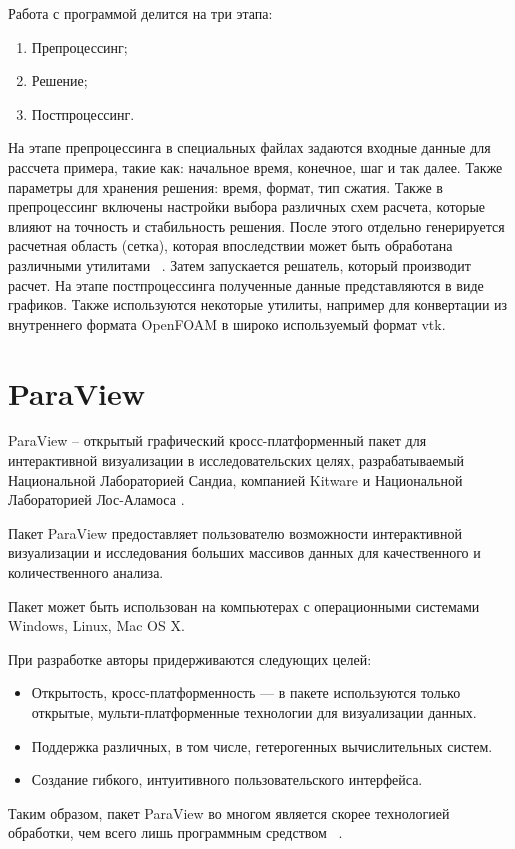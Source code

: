 \documentclass[14pt]{extreport}
\begin{document}
Работа с программой делится на три этапа:
\begin{enumerate}
\item Препроцессинг;
\item Решение;
\item Постпроцессинг.
\end{enumerate}

На этапе препроцессинга в специальных файлах задаются входные данные для рассчета примера, такие как: начальное время, конечное, шаг и так далее. Также параметры для хранения решения: время, формат, тип сжатия. Также в препроцессинг включены настройки выбора различных схем расчета, которые влияют на точность и стабильность решения. После этого отдельно генерируется расчетная область (сетка), которая впоследствии может быть обработана различными утилитами ~\cite{OpenfoamUserGuide}. Затем запускается решатель, который производит расчет. На этапе постпроцессинга полученные данные представляются в виде графиков. Также используются некоторые утилиты, например для конвертации из внутреннего формата OpenFOAM в широко используемый формат vtk.

\section{ParaView}
ParaView -- открытый графический кросс-платформенный пакет для интерактивной визуализации в исследовательских целях, разрабатываемый Национальной Лабораторией Сандиа, компанией Kitware и Национальной Лабораторией Лос-Аламоса \cite{ParaviewAbout}.

Пакет ParaView предоставляет пользователю возможности интерактивной визуализации и исследования больших массивов данных для качественного и количественного анализа.

Пакет может быть использован на компьютерах с операционными системами Windows, Linux, Mac OS X.

При разработке авторы придерживаются следующих целей:
\begin{itemize}
\item Открытость, кросс-платформенность — в пакете используются только открытые, мульти-платформенные технологии для визуализации данных.
\item Поддержка различных, в том числе, гетерогенных вычислительных систем.
\item Создание гибкого, интуитивного пользовательского интерфейса.
\end{itemize}

Таким образом, пакет ParaView во многом является скорее технологией обработки, чем всего лишь программным средством ~\cite{ParaviewWiki}.
\end{document}
